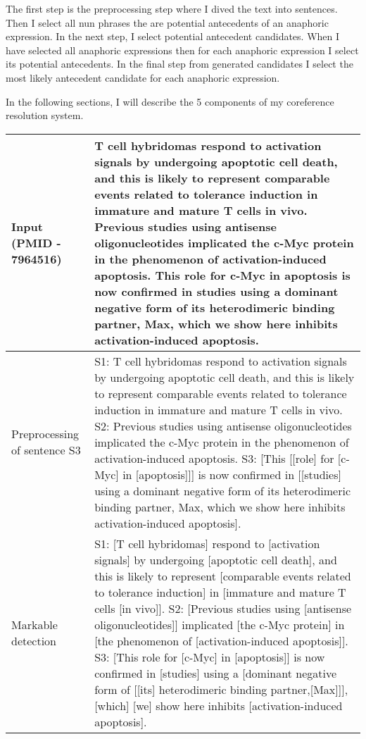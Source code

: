 The first step is the preprocessing step where I dived the text into sentences. Then I select all nun phrases the are potential antecedents of an anaphoric expression. In the next step, I select potential antecedent candidates. When I have selected all anaphoric expressions then for each anaphoric expression I select its potential antecedents. In the final step from generated candidates I select the most likely antecedent candidate for each anaphoric expression.   
   
In the following sections, I will describe the 5 components of my coreference resolution system. 
  
\begin{table}
   \begin{tabular}{ m{20mm} m{113mm} } 
	\footnotesize{Input (PMID - 7964516)}&\footnotesize{T cell hybridomas respond to activation signals by undergoing apoptotic cell death, and this is likely to represent comparable events related to tolerance induction in immature and mature T cells in vivo. Previous studies using antisense oligonucleotides implicated the c-Myc protein in the phenomenon of activation-induced apoptosis. This role for c-Myc in apoptosis is now confirmed in studies using a dominant negative form of its heterodimeric binding partner, Max, which we show here inhibits activation-induced apoptosis.}\\
	\hline
	\footnotesize{Preprocessing of sentence S3}&\footnotesize{S1: T cell hybridomas respond to activation signals by undergoing apoptotic cell death, and this is likely to represent comparable events related to tolerance induction in immature and mature T cells in vivo. S2: Previous studies using antisense oligonucleotides implicated the c-Myc protein in the phenomenon of activation-induced apoptosis. S3: [This [[role] for [c-Myc] in [apoptosis]]] is now confirmed in [[studies] using a dominant negative form of its heterodimeric binding partner, Max, which we show here inhibits activation-induced apoptosis].}\\
	\hline
	\footnotesize{Markable detection} &\footnotesize{S1: [T cell hybridomas] respond to [activation signals] by undergoing [apoptotic cell death], and this is likely to represent [comparable events related to tolerance induction] in [immature and mature T cells [in vivo]]. S2: [Previous studies using [antisense oligonucleotides]] implicated [the c-Myc protein] in [the phenomenon of [activation-induced apoptosis]]. S3: [This role for [c-Myc] in [apoptosis]] is now confirmed in [studies] using a [dominant negative form of [[its] heterodimeric binding partner,[Max]]], [which] [we] show here inhibits [activation-induced apoptosis].}\\

\end{tabular}
\end{table}
